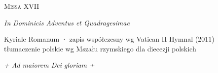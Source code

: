



\begin{center}
  {\Huge\scshape Missa XVII}\par\smallskip
  {\Large\itshape In Dominicis Adventus et Quadragesimae}\par\smallskip
  {\small Kyriale Romanum · zapis współczesny wg Vatican II Hymnal (2011)\\
   tłumaczenie polskie wg Mszału rzymskiego dla diecezji polskich}
\end{center}



\clearpage


\clearpage


\vfill
{\centering\itshape + Ad maiorem Dei gloriam +\par}


